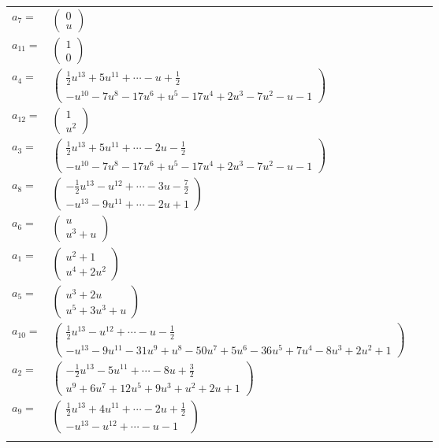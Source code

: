 \documentclass[1p]{elsarticle_modified}
\theoremstyle{definition}
\begin{document}
\begin{tabular}{m{7pt} m{180pt} m{7pt} m{180pt} }
\flushright $a_{7}=$&$\begin{pmatrix}0\\u\end{pmatrix}$ \\
\flushright $a_{11}=$&$\begin{pmatrix}1\\0\end{pmatrix}$ \\
\flushright $a_{4}=$&$\begin{pmatrix}\frac{1}{2} u^{13}+5 u^{11}+\cdots- u+\frac{1}{2}\\- u^{10}-7 u^8-17 u^6+u^5-17 u^4+2 u^3-7 u^2- u-1\end{pmatrix}$ \\
\flushright $a_{12}=$&$\begin{pmatrix}1\\u^2\end{pmatrix}$ \\
\flushright $a_{3}=$&$\begin{pmatrix}\frac{1}{2} u^{13}+5 u^{11}+\cdots-2 u-\frac{1}{2}\\- u^{10}-7 u^8-17 u^6+u^5-17 u^4+2 u^3-7 u^2- u-1\end{pmatrix}$ \\
\flushright $a_{8}=$&$\begin{pmatrix}-\frac{1}{2} u^{13}- u^{12}+\cdots-3 u-\frac{7}{2}\\- u^{13}-9 u^{11}+\cdots-2 u+1\end{pmatrix}$ \\
\flushright $a_{6}=$&$\begin{pmatrix}u\\u^3+u\end{pmatrix}$ \\
\flushright $a_{1}=$&$\begin{pmatrix}u^2+1\\u^4+2 u^2\end{pmatrix}$ \\
\flushright $a_{5}=$&$\begin{pmatrix}u^3+2 u\\u^5+3 u^3+u\end{pmatrix}$ \\
\flushright $a_{10}=$&$\begin{pmatrix}\frac{1}{2} u^{13}- u^{12}+\cdots- u-\frac{1}{2}\\- u^{13}-9 u^{11}-31 u^9+u^8-50 u^7+5 u^6-36 u^5+7 u^4-8 u^3+2 u^2+1\end{pmatrix}$ \\
\flushright $a_{2}=$&$\begin{pmatrix}-\frac{1}{2} u^{13}-5 u^{11}+\cdots-8 u+\frac{3}{2}\\u^9+6 u^7+12 u^5+9 u^3+u^2+2 u+1\end{pmatrix}$ \\
\flushright $a_{9}=$&$\begin{pmatrix}\frac{1}{2} u^{13}+4 u^{11}+\cdots-2 u+\frac{1}{2}\\- u^{13}- u^{12}+\cdots- u-1\end{pmatrix}$\\&\end{tabular}
\end{document}
